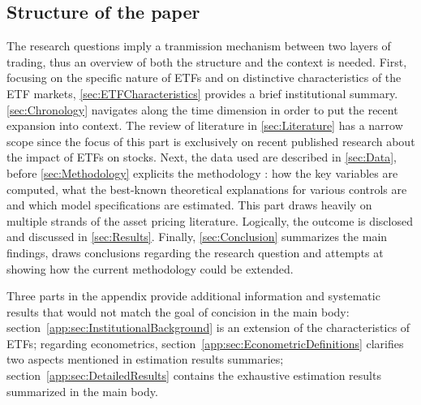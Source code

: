 \subsection{Structure of the paper}
The research questions imply a tranmission mechanism between two layers of trading, thus an overview of both the structure and the context is needed. First, focusing on the specific nature of ETFs and on distinctive characteristics of the ETF markets, \autoref{sec:ETFCharacteristics} provides a brief institutional summary. \autoref{sec:Chronology} navigates along the time dimension in order to put the recent expansion into context. The review of literature in \autoref{sec:Literature} has a narrow scope since the focus of this part is exclusively on recent published research about the impact of ETFs on stocks. Next, the data used are described in \autoref{sec:Data}, before \autoref{sec:Methodology} explicits the methodology : how the key variables are computed, what the best-known theoretical explanations for various controls are and which model specifications are estimated. This part draws heavily on multiple strands of the asset pricing literature. Logically, the outcome is disclosed and discussed in \autoref{sec:Results}. Finally, \autoref{sec:Conclusion} summarizes the main findings, draws conclusions regarding the research question and attempts at showing how the current methodology could be extended.

Three parts in the appendix provide additional information and systematic results that would not match the goal of concision in the main body: section~\autoref{app:sec:InstitutionalBackground} is an extension of the characteristics of ETFs; regarding econometrics, section~\autoref{app:sec:EconometricDefinitions} clarifies two aspects mentioned in estimation results summaries; section~\autoref{app:sec:DetailedResults} contains the exhaustive estimation results summarized in the main body.
